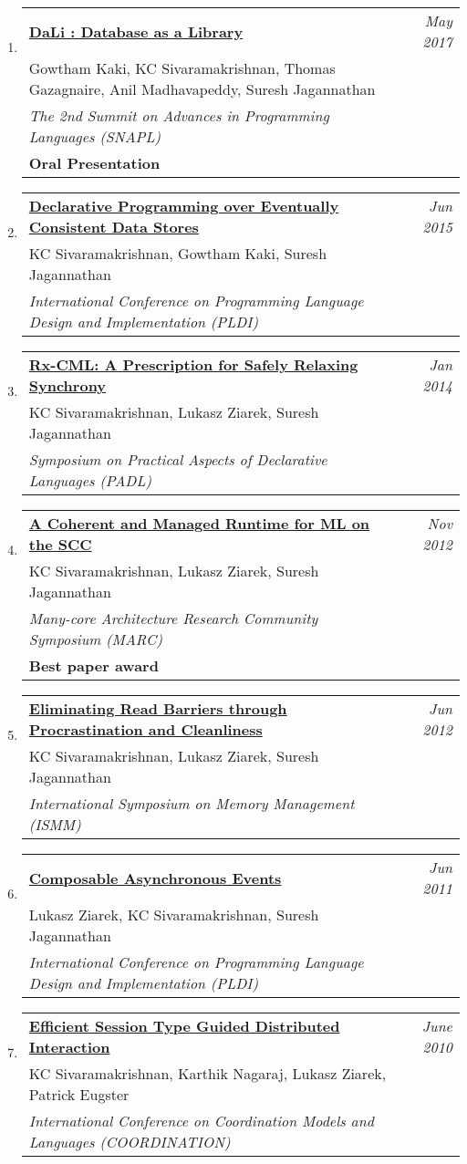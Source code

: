 \documentclass[10pt]{article}
\makeatletter
\newcommand{\lbar}[1]{{\color{#1}\ding{118}}\hspace*{2pt}}
\newenvironment{benumerate}[2]{
    \let\oldItem\item
    \def\item{\addtocounter{enumi}{-2}\oldItem}
    \begin{enumerate}[#2] \itemsep3pt
    \setcounter{enumi}{#1}
    \addtocounter{enumi}{1}}
  {\end{enumerate}}
\newenvironment{publication}[5]
{ \item
  \begin{tabular*}{7.5in}{p{6.3in}@{\extracolsep{\fill}}r}
    \href{#1}{\textbf{#2}} & \textit{#3}\\ #4 &\\ \textit{#5}&\\
  \end{tabular*}
} {}
\newenvironment{publicationNote}[6]
{ \item
  \begin{tabular*}{7.5in}{p{6.3in}@{\extracolsep{\fill}}r}
    \href{#1}{\textbf{#2}} & \textit{#3}\\ #4 &\\ \textit{#5}\\ \textbf{#6} \\
  \end{tabular*}
} {}
\newenvironment{region}[3]{%
  \vspace*{0.5ex}
  {\scalebox{1.4}{\textbf{#1}}}
  \begin{benumerate}{#3}{\color{RoyalBlue}#2}}
  {\end{benumerate}\vspace{0.8ex}}
\makeatother
\begin{document}
\begin{region} {\lbar{purple}Conference Publications}{{C}1}{14}
  \begin{publicationNote} {http://kcsrk.info/papers/dali_snapl17.pdf}
    {DaLi : Database as a Library}
    {May 2017} {Gowtham Kaki, KC Sivaramakrishnan, Thomas Gazagnaire, Anil Madhavapeddy, Suresh Jagannathan}
    {The 2nd Summit on Advances in Programming Languages (SNAPL)}
    {Oral Presentation}
  \end{publicationNote}

  \begin{publication} {http://kcsrk.info/papers/quelea_pldi15.pdf}
    {Declarative Programming over Eventually Consistent Data Stores}
    {Jun 2015} {KC Sivaramakrishnan, Gowtham Kaki, Suresh Jagannathan}
    {International Conference on Programming Language Design and Implementation (PLDI)}
  \end{publication}

  \begin{publication}{http://kcsrk.info/papers/rxcml_padl14.pdf}
    {Rx-CML: A Prescription for Safely Relaxing Synchrony}
    {Jan 2014}{KC Sivaramakrishnan, Lukasz Ziarek, Suresh Jagannathan}
    {Symposium on Practical Aspects of Declarative Languages (PADL)}
  \end{publication}

  \begin{publicationNote}{http://kcsrk.info/papers/mmscc_marc12.pdf}
    {A Coherent and Managed Runtime for ML on the SCC}
    {Nov 2012}{KC Sivaramakrishnan, Lukasz Ziarek, Suresh Jagannathan}
    {Many-core Architecture Research Community Symposium (MARC)}
    {Best paper award}
  \end{publicationNote}

  \begin{publication}{http://kcsrk.info/papers/mmgc_ismm12.pdf}
    {Eliminating Read Barriers through Procrastination and Cleanliness}
    {Jun 2012}{KC Sivaramakrishnan, Lukasz Ziarek, Suresh Jagannathan}
    {International Symposium on Memory Management (ISMM)}
  \end{publication}

  \begin{publication}{http://kcsrk.info/papers/acml_pldi11.pdf}
    {Composable Asynchronous Events}
    {Jun 2011}{Lukasz Ziarek, KC Sivaramakrishnan, Suresh Jagannathan}
    {International Conference on Programming Language Design and Implementation (PLDI)}
  \end{publication}

  \begin{publication}{http://kcsrk.info/papers/sting_coordination10.pdf}
    {Efficient Session Type Guided Distributed Interaction}
    {June 2010}{KC Sivaramakrishnan, Karthik Nagaraj, Lukasz Ziarek, Patrick Eugster}
    {International Conference on Coordination Models and Languages (COORDINATION)}
  \end{publication}


\end{region}
\end{document}
